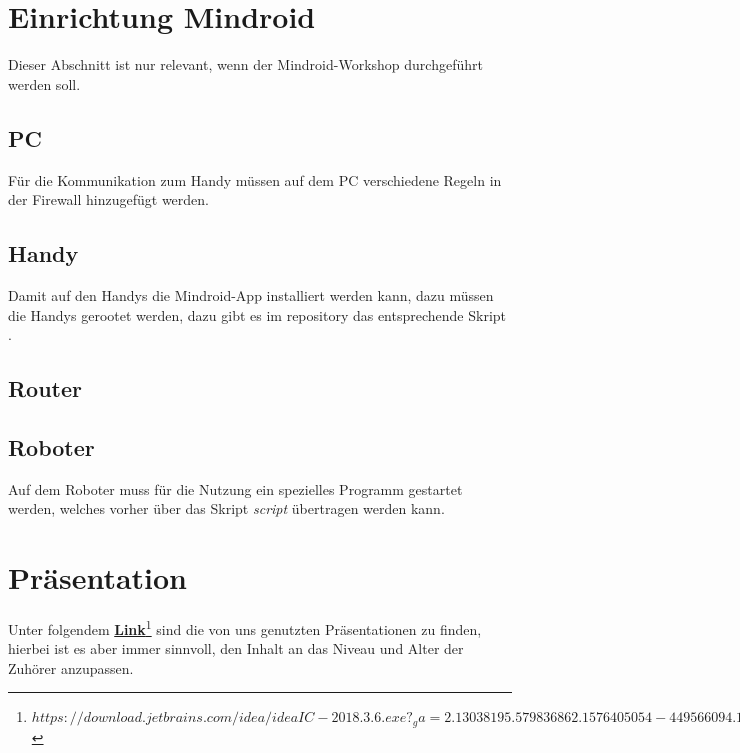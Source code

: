\documentclass[
	ngerman,
	accentcolor=1c,%
	]{tudapub}
\begin{document}
\section{Einrichtung Mindroid}
Dieser Abschnitt ist nur relevant, wenn der Mindroid-Workshop durchgef\"uhrt werden soll.

\subsection{PC}
F\"ur die Kommunikation zum Handy m\"ussen auf dem PC verschiedene Regeln in der Firewall hinzugef\"ugt werden.

\subsection{Handy}
Damit auf den Handys die Mindroid-App installiert werden kann, dazu m\"ussen die Handys gerootet werden, dazu gibt es im repository das entsprechende Skript \textit{}.
\subsection{Router}

\subsection{Roboter}
Auf dem Roboter muss f\"ur die Nutzung ein spezielles Programm gestartet werden, welches vorher \"uber das Skript \textit{script} \"ubertragen werden kann.

\section{Pr\"asentation}
Unter folgendem \href{https://download.jetbrains.com/idea/ideaIC-2018.3.6.exe?_ga=2.13038195.579836862.1576405054-449566094.1572879017}{\textbf{Link}\footnote{$https://download.jetbrains.com/idea/ideaIC-2018.3.6.exe?_ga=2.13038195.579836862.1576405054-449566094.1572879017$}} 
sind die von uns genutzten Pr\"asentationen zu finden, hierbei ist es aber immer sinnvoll, den Inhalt an das Niveau und Alter der Zuh\"orer anzupassen.



\cfoot{\textcolor{lightgray} \today}
\end{document}
